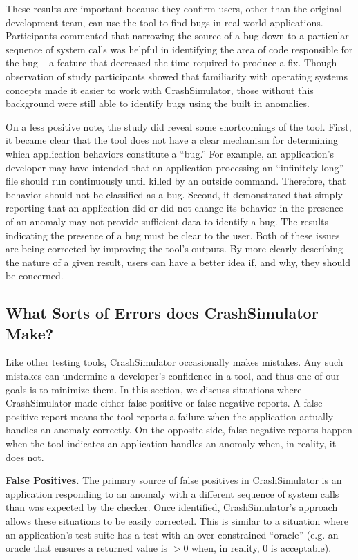 These results are important
because they confirm
users, other than the original development team,
can use the tool to find bugs in real world applications.
Participants commented that narrowing the source of a bug
down to a particular sequence of system calls
was helpful in identifying the area of
code responsible for the bug -- a feature
that decreased the time required to produce a fix.
Though observation of study participants
showed that familiarity with operating systems concepts
made it easier to work with CrashSimulator,
those without this background were still able to identify bugs using the
built in anomalies.

On a less positive note,
the study did reveal
some shortcomings
of the tool.
First,
it became clear that the tool
does not have a clear mechanism
for determining
which application behaviors constitute a ``bug.''
For example, an application's developer
may have intended that an application processing an ``infinitely long'' file should run continuously
until killed by an outside command.
Therefore, that behavior should not be classified as a bug.
Second,
it demonstrated that
simply reporting that an application did or did not change its behavior
in the presence of an anomaly may not provide sufficient data to identify a bug. The results indicating the presence of a bug must be clear to the user.
Both of these issues are being corrected
by improving the tool's outputs.
By more clearly describing
the nature of a given result,
users can have a better idea
if,
and why,
they should be concerned.


\subsection{What Sorts of Errors does CrashSimulator Make?}
\label{sec-sorts-errors}

Like other testing tools, CrashSimulator occasionally makes mistakes.
Any such mistakes can
undermine a developer's confidence in a tool, and thus one of our goals is
to minimize them.   In this section, we discuss
situations where CrashSimulator made either false positive or false
negative reports.  A false positive report means the tool reports
a failure when the application actually handles an anomaly correctly.
On the opposite side, false negative reports happen when the tool indicates an application handles
an anomaly when, in reality, it does not.

\textbf{False Positives.}
The primary source of false positives in CrashSimulator is an application
responding to an anomaly with a different sequence of system calls
than was expected by the checker.
Once identified, CrashSimulator's approach allows these
situations to be easily corrected.
This is similar to a situation
where an application's test suite
has a test with an over-constrained ``oracle''
(e.g. an oracle that ensures a returned value is $>0$ when, in reality,
$0$ is acceptable).

